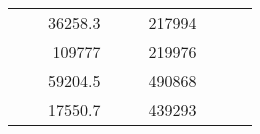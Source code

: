 \begin{table}[H]
\begin{tabular}{|ccrccrccc}
\multicolumn{1}{|c|}{\cellcolor[HTML]{FFFFC7}}                                & \multicolumn{1}{c|}{\cellcolor[HTML]{DAE8FC}}                      & \multicolumn{1}{r|}{\cellcolor[HTML]{DAE8FC}36258.3}   & \multicolumn{1}{c|}{\cellcolor[HTML]{FFFFC7}}                                & \multicolumn{1}{c|}{\cellcolor[HTML]{DAE8FC}}                       & \multicolumn{1}{r|}{\cellcolor[HTML]{DDFDFF}217994}    &                                                                              &                                                                    &                                                        \\ \cline{3-3} \cline{6-6}
\multicolumn{1}{|c|}{\cellcolor[HTML]{FFFFC7}}                                & \multicolumn{1}{c|}{\cellcolor[HTML]{DAE8FC}}                      & \multicolumn{1}{r|}{\cellcolor[HTML]{DDFDFF}109777}    & \multicolumn{1}{c|}{\cellcolor[HTML]{FFFFC7}}                                & \multicolumn{1}{c|}{\cellcolor[HTML]{DAE8FC}}                       & \multicolumn{1}{r|}{\cellcolor[HTML]{DAE8FC}219976}    &                                                                              &                                                                    &                                                        \\ \cline{3-3} \cline{6-6}
\multicolumn{1}{|c|}{\cellcolor[HTML]{FFFFC7}}                                & \multicolumn{1}{c|}{\cellcolor[HTML]{DAE8FC}}                      & \multicolumn{1}{r|}{\cellcolor[HTML]{DAE8FC}59204.5}   & \multicolumn{1}{c|}{\cellcolor[HTML]{FFFFC7}}                                & \multicolumn{1}{c|}{\cellcolor[HTML]{DAE8FC}}                       & \multicolumn{1}{r|}{\cellcolor[HTML]{DDFDFF}490868}    &                                                                              &                                                                    &                                                        \\ \cline{3-3} \cline{6-6}
\multicolumn{1}{|c|}{\cellcolor[HTML]{FFFFC7}}                                & \multicolumn{1}{c|}{\cellcolor[HTML]{DAE8FC}}                      & \multicolumn{1}{r|}{\cellcolor[HTML]{DDFDFF}17550.7}   & \multicolumn{1}{c|}{\cellcolor[HTML]{FFFFC7}}                                & \multicolumn{1}{c|}{\cellcolor[HTML]{DAE8FC}}                       & \multicolumn{1}{r|}{\cellcolor[HTML]{DAE8FC}439293}    &                                                                              &                                                                    &                                                        \\ \cline{3-3} \cline{6-6}

\end{tabular}
\end{table}
